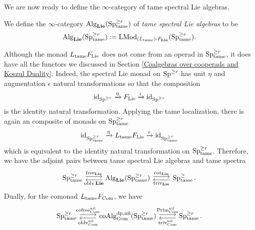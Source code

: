 We are now ready to define the $\infty$-category of tame spectral Lie algebras.
\begin{definition}
\label{Def of tame spectral Lie algebras}
    We define the $\infty$-category $\operatorname{Alg}_{\mathbf{Lie}}(\operatorname{Sp}^{\geq r}_{\operatorname{\operatorname{tame}}})$ of \emph{tame spectral Lie algebras} to be 
    $$
    \operatorname{Alg}_{\mathbf{Lie}}(\operatorname{Sp}^{\geq r}_{\operatorname{\operatorname{tame}}}) := \operatorname{LMod}_{	(L_{\operatorname{\operatorname{tame}}})_{!}F_{\mathbf{Lie}}}(\operatorname{Sp}^{\geq r}_{\operatorname{\operatorname{tame}}}).
    $$
\end{definition}
\begin{remark}
Although the monad $L_{\operatorname{\operatorname{tame}}}F_{\operatorname{Lie}}$ does not come from an operad in $\operatorname{Sp}^{\geq r}_{\operatorname{\operatorname{tame}}}$, it does have all the functors we discussed in Section \ref{Coalgebras over cooperads and Koszul Duality}.
Indeed, the spectral Lie monad on $\operatorname{Sp}^{\geq r}$ has unit $\eta$ and augmentation $\epsilon$ natural transformations so that the composition 
\[
\operatorname{id}_{\operatorname{Sp}^{\geq r}}
\xrightarrow{\eta}
F_{\operatorname{Lie}}\xrightarrow{\epsilon}
\operatorname{id}_{\operatorname{Sp}^{\geq r}}
\]
is the identity natural transformation.
Applying the tame localization, there is again an composite of monads on $\operatorname{Sp}^{\geq r}_{\operatorname{\operatorname{tame}}}$
\[
\operatorname{id}_{\operatorname{Sp}^{\geq r}_{\operatorname{\operatorname{tame}}}}
\xrightarrow{\eta}
L_{\operatorname{\operatorname{tame}}}F_{\operatorname{Lie}}\xrightarrow{\epsilon}
\operatorname{id}_{\operatorname{Sp}^{\geq r}_{\operatorname{\operatorname{tame}}}}
\]
which is equivalent to the identity natural transformation on $\operatorname{Sp}^{\geq r}_{\operatorname{\operatorname{tame}}}$.
Therefore, we have the adjoint pairs between tame spectral Lie algebras and tame spectra
\[
\begin{tikzcd}
\Sp^{\geq r}_{\tame} & \Alg_{\spLie}(\Sp^{\geq r}_{\tame}) & \Sp^{\geq}_{\tame}
	\arrow[from=1-1, to= 1-2, shift left = 1, "\Free_{\spLie}" above]
	\arrow[from=1-2, to=1-1, shift left = 1, "\oblv{\spLie}" below]
	\arrow[from=1-2, to= 1-3, shift left = 1, "\cot_{\spLie}" above]
	\arrow[from=1-3, to=1-2, shift left = 1, "\trivial_{\spLie}" below].
\end{tikzcd}
\]
Dually, for the comonad $L_{\operatorname{\operatorname{tame}}}F_{\operatorname{Com}}$, we have 
\[
\begin{tikzcd}
\Sp^{\geq r}_{\tame} & \coAlg^{\divpow, \nil}_{\Com}(\Sp^{\geq r}_{\tame}) & \Sp^{\geq r}_{\tame}.
	\arrow[from=1-1, to= 1-2, shift left = 1, "\cofree^{\nil}_{\Com}" above]
	\arrow[from=1-2, to=1-1, shift left = 1, "\oblv^{\nil}_{\Com}" below]
	\arrow[from=1-2, to= 1-3, shift left = 1, "\operatorname{Prim}^{\nil}_{\Com}" above]
	\arrow[from=1-3, to=1-2, shift left = 1, "\trivial^{\nil}_{\Com}" below]
\end{tikzcd}
\]
\end{remark}



